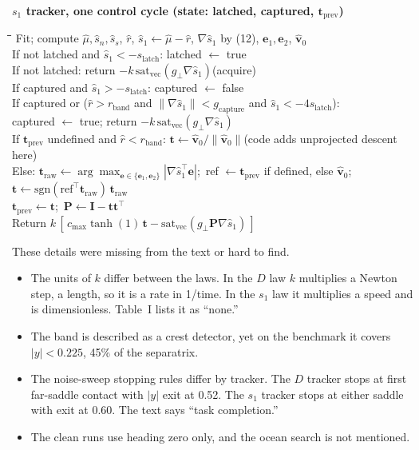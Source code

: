 \documentclass[10.5pt]{article}
\newcommand{\shat}{\hat{s}_1}
\newcommand{\satv}{\mathrm{sat}_{\mathrm{vec}}}
\newenvironment{pcode}[1]
  {\par\smallskip\noindent\begin{lrbox}{\pcbox}\begin{minipage}{\dimexpr\linewidth-2\fboxsep}\small\textbf{#1}\par\smallskip\begin{tabbing}\hspace*{1.2em}\=\hspace*{1.2em}\=\hspace*{1.2em}\=\kill}
  {\end{tabbing}\end{minipage}\end{lrbox}\colorbox{boxgray}{\usebox{\pcbox}}\par\smallskip}
\begin{document}
\begin{pcode}{$s_1$ tracker, one control cycle (state: latched, captured, $\mathbf t_{\mathrm{prev}}$)}
Fit; compute $\hat\mu,\hat s_n,\hat s_s$, $\hat r$, $\shat\leftarrow\hat\mu-\hat r$, $\nabla\shat$ by (12), $\mathbf e_1,\mathbf e_2$, $\hat{\mathbf v}_0$\\
If not latched and $\shat<-s_{\mathrm{latch}}$: latched $\leftarrow$ true\\
If not latched: return $-k\,\satv(g_\perp\nabla\shat)$\quad(acquire)\\
If captured and $\shat>-s_{\mathrm{latch}}$: captured $\leftarrow$ false\\
If captured or ($\hat r>r_{\mathrm{band}}$ and $\|\nabla\shat\|<g_{\mathrm{capture}}$ and $\shat<-4s_{\mathrm{latch}}$):\\
\>captured $\leftarrow$ true; return $-k\,\satv(g_\perp\nabla\shat)$\\
If $\mathbf t_{\mathrm{prev}}$ undefined and $\hat r<r_{\mathrm{band}}$: $\mathbf t\leftarrow\hat{\mathbf v}_0/\|\hat{\mathbf v}_0\|$\quad(code adds unprojected descent here)\\
Else: $\mathbf t_{\mathrm{raw}}\leftarrow\arg\max_{\mathbf e\in\{\mathbf e_1,\mathbf e_2\}}|\nabla\shat^\top\mathbf e|$;\ ref $\leftarrow\mathbf t_{\mathrm{prev}}$ if defined, else $\hat{\mathbf v}_0$;\ $\mathbf t\leftarrow\mathrm{sgn}(\mathrm{ref}^\top\mathbf t_{\mathrm{raw}})\,\mathbf t_{\mathrm{raw}}$\\
$\mathbf t_{\mathrm{prev}}\leftarrow\mathbf t$;\ $\mathbf P\leftarrow\mathbf I-\mathbf t\mathbf t^\top$\\
Return $k\,[\,c_{\max}\tanh(1)\,\mathbf t-\satv(g_\perp\mathbf P\nabla\shat)\,]$
\end{pcode}

These details were missing from the text or hard to find.
\begin{itemize}[leftmargin=1.2em]
\item The units of $k$ differ between the laws. In the $D$ law $k$ multiplies a Newton step, a length, so it is a rate in 1/time. In the $s_1$ law it multiplies a speed and is dimensionless. Table~I lists it as ``none.''
\item The band is described as a crest detector, yet on the benchmark it covers $|y|<0.225$, 45\% of the separatrix.
\item The noise-sweep stopping rules differ by tracker. The $D$ tracker stops at first far-saddle contact with $|y|$ exit at 0.52. The $s_1$ tracker stops at either saddle with exit at 0.60. The text says ``task completion.''
\item The clean runs use heading zero only, and the ocean search is not mentioned.
\end{itemize}
\end{document}
